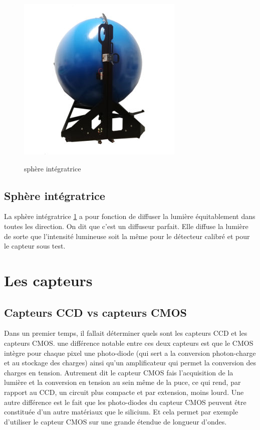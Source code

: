 \documentclass{article}
\begin{document}
\begin{figure}[H]
\centering
\includegraphics[scale=0.7]{sphere_integrante.jpg}
\label{fig:3}
\caption{sphère intégratrice}
\end{figure}

\subsection{Sphère intégratrice}
La sphère intégratrice \ref{fig:3} a pour fonction de diffuser la lumière équitablement dans toutes les direction. On dit que c'est un diffuseur parfait. Elle diffuse la lumière de sorte que l'intensité lumineuse soit la même pour le détecteur calibré et pour le capteur sous test.


\section{Les capteurs}
\subsection{Capteurs CCD vs capteurs CMOS}
Dans un premier temps, il fallait déterminer quels sont les capteurs CCD et les capteurs CMOS.
une différence notable entre ces deux capteurs est que le CMOS intègre pour chaque pixel une photo-diode (qui sert a la conversion photon-charge et au stockage des charges) ainsi qu'un amplificateur qui permet la conversion des charges en tension. Autrement dit le capteur CMOS fais l'acquisition de la lumière et la conversion en tension au sein même de la puce, ce qui rend, par rapport au CCD, un circuit plus compacte et par extension, moins lourd.
Une autre différence est le fait que les photo-diodes du capteur CMOS peuvent être constituée d'un autre matériaux que le silicium. Et cela permet par exemple d'utiliser le capteur CMOS sur une grande étendue de longueur d'ondes. 
\end{document}
